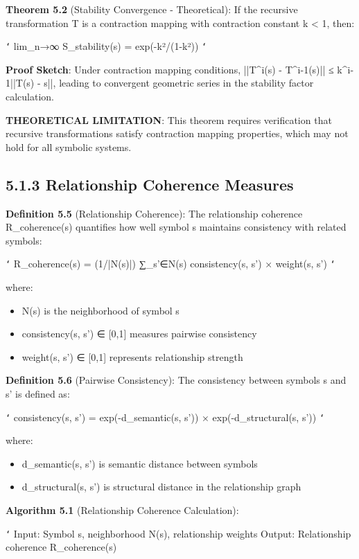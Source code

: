 \textbf{Theorem 5.2} (Stability Convergence - Theoretical): If the recursive transformation T is a contraction mapping with contraction constant k < 1, then:

\texttt{`}
lim_{n→∞} S_stability(s) = exp(-k²/(1-k²))
\texttt{`}

\textbf{Proof Sketch}: Under contraction mapping conditions, ||T^i(s) - T^{i-1}(s)|| ≤ k^{i-1}||T(s) - s||, leading to convergent geometric series in the stability factor calculation.

\textbf{THEORETICAL LIMITATION}: This theorem requires verification that recursive transformations satisfy contraction mapping properties, which may not hold for all symbolic systems.

\subsection{5.1.3 Relationship Coherence Measures}

\textbf{Definition 5.5} (Relationship Coherence): The relationship coherence R_coherence(s) quantifies how well symbol s maintains consistency with related symbols:

\texttt{`}
R_coherence(s) = (1/|N(s)|) ∑_{s'∈N(s)} consistency(s, s') × weight(s, s')
\texttt{`}

where:
\begin{itemize}
\item N(s) is the neighborhood of symbol s
\item consistency(s, s') ∈ [0,1] measures pairwise consistency
\item weight(s, s') ∈ [0,1] represents relationship strength
\end{itemize}

\textbf{Definition 5.6} (Pairwise Consistency): The consistency between symbols s and s' is defined as:

\texttt{`}
consistency(s, s') = exp(-d_semantic(s, s')) × exp(-d_structural(s, s'))
\texttt{`}

where:
\begin{itemize}
\item d_semantic(s, s') is semantic distance between symbols
\item d_structural(s, s') is structural distance in the relationship graph
\end{itemize}

\textbf{Algorithm 5.1} (Relationship Coherence Calculation):

\texttt{`}
Input: Symbol s, neighborhood N(s), relationship weights
Output: Relationship coherence R_coherence(s)

